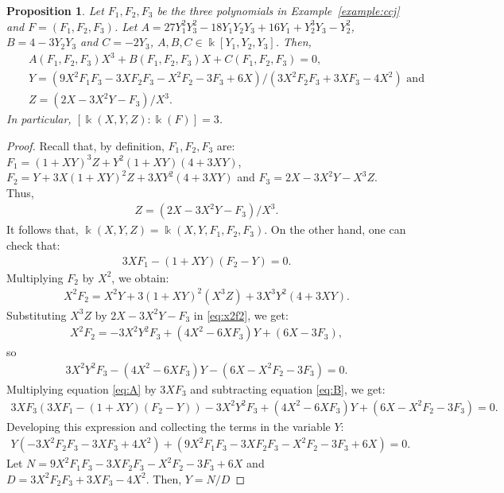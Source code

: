 \documentclass[11pt,reqno]{amsart}
\newtheorem{proposition}[theorem]{Proposition}
\theoremstyle{definition}
\newcommand{\mbk}{\mbox{$\Bbbk$}}
\begin{document}
\begin{proposition}\label{prop:degree}
Let $F_1,F_2,F_3$ be the three polynomials in {\rm Example~\ref{example:ccj}} and $F=(F_1,F_2,F_3)$.
Let $A=27Y_1^2Y_3^2-18Y_1Y_2Y_3+16Y_1+Y_2^3Y_3-Y_2^2$, $B=4-3Y_2Y_3$ and $C=-2Y_3$, $A,B,C\in\mbk[Y_1,Y_2,Y_3]$. Then, 
\begin{eqnarray}
&&A(F_1,F_2,F_3)X^3+B(F_1,F_2,F_3)X+C(F_1,F_2,F_3)=0,\label{eq:x}\\
&&Y=(9X^2F_1F_3-3XF_2F_3-X^2F_2-3F_3+6X)/(3X^2F_2F_3+3XF_3-4X^2)\mbox{ and }\label{eq:y}\\
&&Z=(2X-3X^2Y-F_3)/X^3\label{eq:z}.
\end{eqnarray}
In particular, $[\mbk(X,Y,Z):\mbk(F)]=3$. 
\end{proposition}
\begin{proof}
Recall that, by definition, $F_1,F_2,F_3$ are:
$F_1=(1+XY)^3Z+Y^2(1+XY)(4+3XY)$, $F_2=Y+3X(1+XY)^2Z+3XY^2(4+3XY)$ and 
$F_3=2X-3X^2Y-X^3Z$. Thus, 
\begin{eqnarray*}%
Z=(2X-3X^2Y-F_3)/X^3. 
\end{eqnarray*}
It follows that,
$\mbk(X,Y,Z)=\mbk(X,Y,F_1,F_2,F_3)$. On the other hand, one can check that:
\begin{eqnarray}\label{eq:A}
3XF_1-(1+XY)(F_2-Y)=0.
\end{eqnarray}    
Multiplying $F_2$ by $X^2$, we obtain:
\begin{eqnarray}\label{eq:x2f2}
X^2F_2=X^2Y+3(1+XY)^2(X^3Z)+3X^3Y^2(4+3XY).
\end{eqnarray}
Substituting $X^3Z$ by $2X-3X^2Y-F_3$ in \eqref{eq:x2f2}, we get:
\begin{eqnarray*}
X^2F_2=-3X^2Y^2F_3+(4X^2-6XF_3)Y+(6X-3F_3),
\end{eqnarray*}
so 
\begin{eqnarray}\label{eq:B}
3X^2Y^2F_3-(4X^2-6XF_3)Y-(6X-X^2F_2-3F_3)=0.
\end{eqnarray}
Multiplying equation \eqref{eq:A} by $3XF_3$ and subtracting equation \eqref{eq:B}, we get:
\begin{eqnarray*}
3XF_3(3XF_1-(1+XY)(F_2-Y))-3X^2Y^2F_3+(4X^2-6XF_3)Y+(6X-X^2F_2-3F_3)=0.
\end{eqnarray*}
Developing this expression and collecting the terms in the variable $Y$:
\begin{eqnarray}\label{eq:Y}
Y(-3X^2F_2F_3-3XF_3+4X^2)+(9X^2F_1F_3-3XF_2F_3-X^2F_2-3F_3+6X)=0.
\end{eqnarray}
Let $N=9X^2F_1F_3-3XF_2F_3-X^2F_2-3F_3+6X$ and $D=3X^2F_2F_3+3XF_3-4X^2$. Then, $Y=N/D$

\end{proof}
\end{document}
